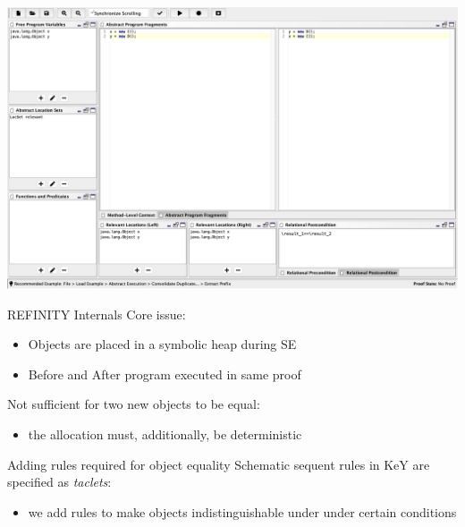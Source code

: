 \begin{frame}\vspace*{-5mm}
\begin{center}
  \includegraphics[scale=.25]{screenshots/Slide}
\end{center}
\end{frame}

\begin{frame}{REFINITY Internals}
  Core issue:
  \begin{itemize}
    \item Objects are placed in a symbolic heap during SE
    \item Before and After program executed in same proof
    \end{itemize}

\medskip    
Not sufficient for two new objects to be equal:
  \begin{itemize}
    \item the allocation must, additionally, be deterministic
  \end{itemize}
\end{frame}


\begin{frame}{Adding rules required for object equality}
  Schematic sequent rules in KeY are specified as \textit{taclets}:
  \begin{itemize}
  \item we add rules to make objects indistinguishable under under certain conditions
  \end{itemize}
\end{frame}

